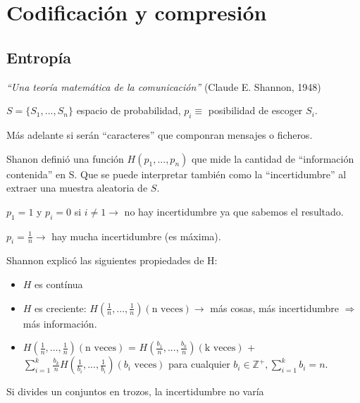 \chapter{Codificación y compresión}


\section{Entropía}

	\textit{``Una teoría matemática de la comunicación''} (Claude E. Shannon, 1948)

	\begin{defn}
		$S = \{ S_1, ... , S_n \}$  espacio de probabilidad, $p_i \equiv$ posibilidad de escoger $S_i$.

	\end{defn}

	Más adelante si serán ``caracteres'' que componran mensajes o ficheros.

	\begin{defn}
		Shanon definió una función $ H(p_1, ..., p_n)$ que mide la cantidad de ``información contenida'' en S. Que se puede interpretar también como la ``incertidumbre'' al extraer una muestra aleatoria de $S$.
	\end{defn}

	\begin{example}
		$p_1 = 1$ y $p_i = 0$ si $i \neq 1 \rightarrow $ no hay incertidumbre ya que sabemos el resultado.

		$p_i = \frac{1}{n} \rightarrow $ hay mucha incertidumbre (es máxima).
	\end{example}


	Shannon explicó las siguientes propiedades de H:
	\begin{itemize}
		\item $H$ es contínua
		\item $H$ es creciente: $H(\frac{1}{n},...,\frac{1}{n}) (\text{n veces}) \rightarrow$ más cosas, más incertidumbre $\Rightarrow$ más información.
		\item $H(\frac{1}{n},...,\frac{1}{n}) (\text{n veces})$ =  $H(\frac{b_1}{n},...,\frac{b_k}{n}) (\text{k veces})$ + $\sum^{k}_{i = 1} \frac{b_k}{n} H(\frac{1}{b_i},...,\frac{1}{b_i}) (b_i \text{ veces})$ para cualquier $b_i \in \mathbb{Z}^+, \sum^{k}_{i = 1} b_i = n$.
	\end{itemize}

	\begin{prop}
		Si divides un conjuntos en trozos, la incertidumbre no varía
	\end{prop}

